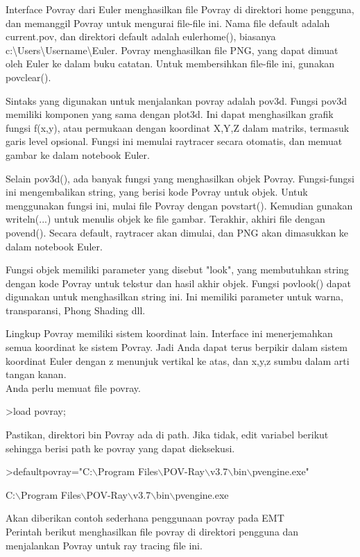 \documentclass[a4paper,10pt]{article}
\begin{document}
\begin{eulernotebook}
\begin{eulercomment}
Interface Povray dari Euler menghasilkan file Povray di direktori home
pengguna, dan memanggil Povray untuk mengurai file-file ini. Nama file
default adalah current.pov, dan direktori default adalah eulerhome(),
biasanya c:\textbackslash{}Users\textbackslash{}Username\textbackslash{}Euler. Povray menghasilkan file PNG, yang
dapat dimuat oleh Euler ke dalam buku catatan. Untuk membersihkan
file-file ini, gunakan povclear().

Sintaks yang digunakan untuk menjalankan povray adalah pov3d. Fungsi
pov3d memiliki komponen yang sama dengan plot3d. Ini dapat
menghasilkan grafik fungsi f(x,y), atau permukaan dengan koordinat
X,Y,Z dalam matriks, termasuk garis level opsional. Fungsi ini memulai
raytracer secara otomatis, dan memuat gambar ke dalam notebook Euler.

Selain pov3d(), ada banyak fungsi yang menghasilkan objek Povray.
Fungsi-fungsi ini mengembalikan string, yang berisi kode Povray untuk
objek. Untuk menggunakan fungsi ini, mulai file Povray dengan
povstart(). Kemudian gunakan writeln(...) untuk menulis objek ke file
gambar. Terakhir, akhiri file dengan povend(). Secara default,
raytracer akan dimulai, dan PNG akan dimasukkan ke dalam notebook
Euler.

Fungsi objek memiliki parameter yang disebut "look", yang membutuhkan
string dengan kode Povray untuk tekstur dan hasil akhir objek. Fungsi
povlook() dapat digunakan untuk menghasilkan string ini. Ini memiliki
parameter untuk warna, transparansi, Phong Shading dll.

Lingkup Povray memiliki sistem koordinat lain. Interface ini
menerjemahkan semua koordinat ke sistem Povray. Jadi Anda dapat terus
berpikir dalam sistem koordinat Euler dengan z menunjuk vertikal ke
atas, dan x,y,z sumbu dalam arti tangan kanan.\\
Anda perlu memuat file povray.
\end{eulercomment}
\begin{eulerprompt}
>load povray;
\end{eulerprompt}
\begin{eulercomment}
Pastikan, direktori bin Povray ada di path. Jika tidak, edit variabel
berikut sehingga berisi path ke povray yang dapat dieksekusi.
\end{eulercomment}
\begin{eulerprompt}
>defaultpovray="C:\(\backslash\)Program Files\(\backslash\)POV-Ray\(\backslash\)v3.7\(\backslash\)bin\(\backslash\)pvengine.exe"
\end{eulerprompt}
\begin{euleroutput}
  C:\(\backslash\)Program Files\(\backslash\)POV-Ray\(\backslash\)v3.7\(\backslash\)bin\(\backslash\)pvengine.exe
\end{euleroutput}
\begin{eulercomment}
Akan diberikan contoh sederhana penggunaan povray pada EMT\\
Perintah berikut menghasilkan file povray di direktori pengguna dan
menjalankan Povray untuk ray tracing file ini.


\end{eulercomment}
\end{eulernotebook}
\end{document}
